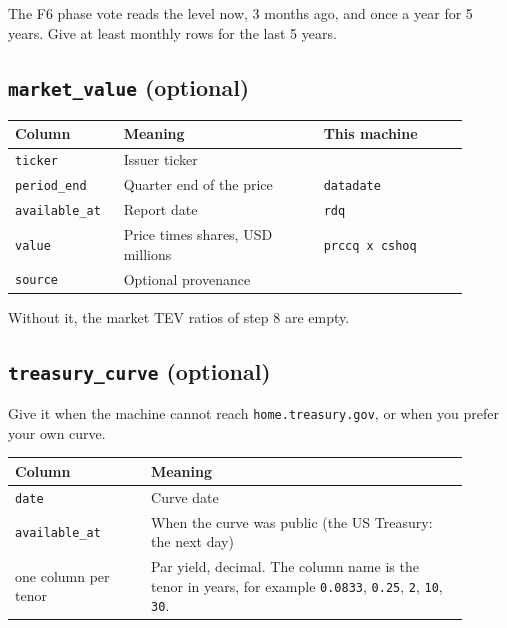 \documentclass[10.5pt,a4paper]{article}
\newcommand{\code}[1]{\texttt{\small #1}}
\begin{document}
The F6 phase vote reads the level now, 3 months ago, and once a year for 5 years. Give at least monthly rows for the last 5 years.

\subsection{\code{market\_\allowbreak{}value} (optional)}

\begin{longtable}{@{}>{\raggedright\arraybackslash}p{0.198\linewidth}>{\raggedright\arraybackslash}p{0.405\linewidth}>{\raggedright\arraybackslash}p{0.297\linewidth}@{}}
\toprule
\textbf{Column} & \textbf{Meaning} & \textbf{This machine}\\
\midrule
\endhead
\code{ticker} & Issuer ticker & \\
\code{period\_\allowbreak{}end} & Quarter end of the price & \code{datadate}\\
\code{available\_\allowbreak{}at} & Report date & \code{rdq}\\
\code{value} & Price times shares, USD millions & \code{prccq x cshoq}\\
\code{source} & Optional provenance & \\
\bottomrule
\end{longtable}

Without it, the market TEV ratios of step 8 are empty.

\subsection{\code{treasury\_\allowbreak{}curve} (optional)}

Give it when the machine cannot reach \code{home.treasury.gov}, or when you prefer your own curve.

\begin{longtable}{@{}>{\raggedright\arraybackslash}p{0.270\linewidth}>{\raggedright\arraybackslash}p{0.630\linewidth}@{}}
\toprule
\textbf{Column} & \textbf{Meaning}\\
\midrule
\endhead
\code{date} & Curve date\\
\code{available\_\allowbreak{}at} & When the curve was public (the US Treasury: the next day)\\
one column per tenor & Par yield, decimal. The column name is the tenor in years, for example \code{0.0833}, \code{0.25}, \code{2}, \code{10}, \code{30}.\\
\bottomrule
\end{longtable}
\end{document}
